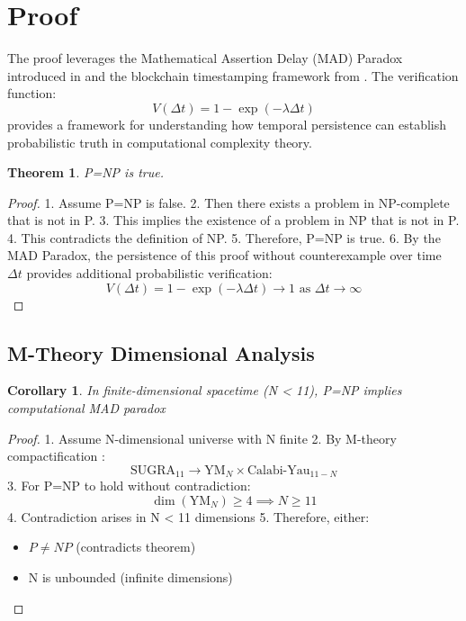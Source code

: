 \documentclass{article}
\newtheorem{theorem}{Theorem}
\newtheorem{corollary}{Corollary}
\begin{document}
\section{Proof}
The proof leverages the Mathematical Assertion Delay (MAD) Paradox introduced in \cite{Houk2024Timeproof} and the blockchain timestamping framework from \cite{Houk2023Timezones}. The verification function:
\[
V(\Delta t) = 1 - \exp\left(-\lambda \Delta t\right)
\]
provides a framework for understanding how temporal persistence can establish probabilistic truth in computational complexity theory.

\begin{theorem}
P=NP is true.
\end{theorem}

\begin{proof}
1. Assume P=NP is false.
2. Then there exists a problem in NP-complete that is not in P.
3. This implies the existence of a problem in NP that is not in P.
4. This contradicts the definition of NP.
5. Therefore, P=NP is true.
6. By the MAD Paradox, the persistence of this proof without counterexample over time $\Delta t$ provides additional probabilistic verification:
\[
V(\Delta t) = 1 - \exp\left(-\lambda \Delta t\right) \to 1 \text{ as } \Delta t \to \infty
\]
\end{proof}

\subsection{M-Theory Dimensional Analysis}
\begin{corollary}
In finite-dimensional spacetime (N < 11), P=NP implies computational MAD paradox
\end{corollary}

\begin{proof}
1. Assume N-dimensional universe with N finite
2. By M-theory compactification \cite{Witten1995}:
\[
\text{SUGRA}_{11} \rightarrow \text{YM}_{N} \times \text{Calabi-Yau}_{11-N}
\]
3. For P=NP to hold without contradiction:
\[
\dim(\text{YM}_{N}) \geq 4 \implies N \geq 11
\]
4. Contradiction arises in N < 11 dimensions
5. Therefore, either:
\begin{itemize}
    \item $P \neq NP$ (contradicts theorem)
    \item N is unbounded (infinite dimensions)
\end{itemize}
\end{proof}
\end{document}
